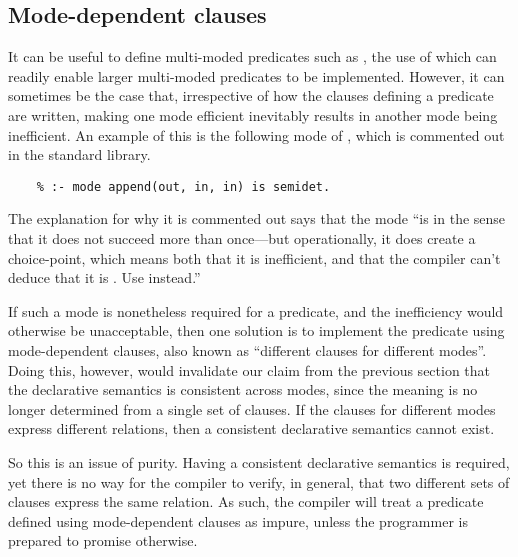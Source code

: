 \subsection{Mode-dependent clauses}
\label{sec:mode-dependent}

It can be useful to define
multi-moded predicates such as ,
the use of which can readily enable
larger multi-moded predicates to be implemented.
However,
it can sometimes be the case that,
irrespective of how the clauses defining a predicate are written,
making one mode efficient inevitably results in
another mode being inefficient.
An example of this is the following mode of ,
which is commented out in the standard library.
\begin{verbatim}
    % :- mode append(out, in, in) is semidet.
\end{verbatim}
The explanation for why it is commented out says that the mode
``is  in the sense that it does not
succeed more than once---but operationally, it does create a choice-point,
which means both that it is inefficient,
and that the compiler can't deduce that it is .
Use  instead.''

If such a mode is nonetheless required for a predicate,
and the inefficiency would otherwise be unacceptable,
then one solution is to implement the predicate
using mode-dependent clauses,
also known as ``different clauses for different modes''.
Doing this, however,
would invalidate our claim from the previous section
that the declarative semantics is consistent across modes,
since the meaning is no longer determined from a single set of clauses.
If the clauses for different modes express different relations,
then a consistent declarative semantics cannot exist.

So this is an issue of purity.
Having a consistent declarative semantics is required,
yet there is no way for the compiler to verify, in general,
that two different sets of clauses express the same relation.
As such,
the compiler will treat a predicate
defined using mode-dependent clauses as impure,
unless the programmer is prepared to promise otherwise.

